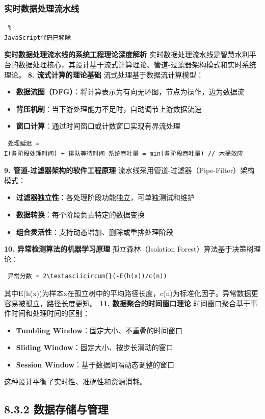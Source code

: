 \subsubsection{实时数据处理流水线}\label{ux5b9eux65f6ux6570ux636eux5904ux7406ux6d41ux6c34ux7ebf} \begin{lstlisting} %
JavaScript代码已移除 \end{lstlisting} \textbf{实时数据处理流水线的系统工程理论深度解析} 实时数据处理流水线是智慧水利平台的数据处理核心，其设计基于流式计算理论、管道-过滤器架构模式和实时系统理论。
\textbf{8. 流式计算的理论基础} 流式处理基于数据流计算模型： \begin{itemize} \tightlist \item \textbf{数据流图（DFG）}：将计算表示为有向无环图，节点为操作，边为数据流 \item
\textbf{背压机制}：当下游处理能力不足时，自动调节上游数据流速 \item \textbf{窗口计算}：通过时间窗口或计数窗口实现有界流处理 \end{itemize} \begin{lstlisting} 处理延迟 =
Σ(各阶段处理时间) + 排队等待时间 系统吞吐量 = min(各阶段吞吐量) // 木桶效应 \end{lstlisting} \textbf{9. 管道-过滤器架构的软件工程原理}
流水线采用管道-过滤器（Pipe-Filter）架构模式： \begin{itemize} \tightlist \item \textbf{过滤器独立性}：各处理阶段功能独立，可单独测试和维护 \item
\textbf{数据转换}：每个阶段负责特定的数据变换 \item \textbf{组合灵活性}：支持动态增加、删除或重排处理阶段 \end{itemize} \textbf{10. 异常检测算法的机器学习原理}
孤立森林（Isolation Forest）算法基于决策树理论： \begin{lstlisting} 异常分数 = 2\textasciicircum{}(-E(h(x))/c(n)) \end{lstlisting}
其中E(h(x))为样本x在孤立树中的平均路径长度，c(n)为标准化因子。异常数据更容易被孤立，路径长度更短。 \textbf{11. 数据聚合的时间窗口理论} 时间窗口聚合基于事件时间和处理时间的区别： \begin{itemize}
\tightlist \item \textbf{Tumbling Window}：固定大小、不重叠的时间窗口 \item \textbf{Sliding Window}：固定大小、按步长滑动的窗口\\ \item
\textbf{Session Window}：基于数据间隔动态调整的窗口 \end{itemize} 这种设计平衡了实时性、准确性和资源消耗。 \subsection{8.3.2
数据存储与管理}\label{ux6570ux636eux5b58ux50a8ux4e0eux7ba1ux7406}
